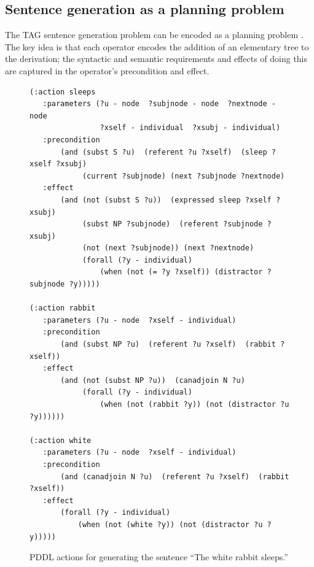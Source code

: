 \subsection{Sentence generation as a planning problem}

The TAG sentence generation problem can be encoded as a planning
problem \cite{KolSto07}.  The key idea is that each operator encodes
the addition of an elementary tree to the derivation; the syntactic
and semantic requirements and effects of doing this are captured in
the operator's precondition and effect.

\begin{figure}
\centering
\begin{minipage}{0.8\textwidth}
{\small%
\begin{verbatim}
(:action sleeps
   :parameters (?u - node  ?subjnode - node  ?nextnode - node
                ?xself - individual  ?xsubj - individual)
   :precondition
       (and (subst S ?u)  (referent ?u ?xself)  (sleep ?xself ?xsubj)
            (current ?subjnode) (next ?subjnode ?nextnode)
   :effect 
       (and (not (subst S ?u))  (expressed sleep ?xself ?xsubj)
            (subst NP ?subjnode)  (referent ?subjnode ?xsubj)
            (not (next ?subjnode)) (next ?nextnode)
            (forall (?y - individual)
                (when (not (= ?y ?xself)) (distractor ?subjnode ?y)))))

(:action rabbit
   :parameters (?u - node  ?xself - individual)
   :precondition 
       (and (subst NP ?u)  (referent ?u ?xself)  (rabbit ?xself))
   :effect 
       (and (not (subst NP ?u))  (canadjoin N ?u)
            (forall (?y - individual)
                (when (not (rabbit ?y)) (not (distractor ?u ?y))))))

(:action white
   :parameters (?u - node  ?xself - individual)
   :precondition 
       (and (canadjoin N ?u)  (referent ?u ?xself)  (rabbit ?xself))
   :effect 
       (forall (?y - individual)
           (when (not (white ?y)) (not (distractor ?u ?y)))))
\end{verbatim}}%
\end{minipage}
\caption{PDDL actions for generating the sentence ``The white rabbit
sleeps.''}
\label{fig:white-rabbit-as-planning}
\end{figure}

